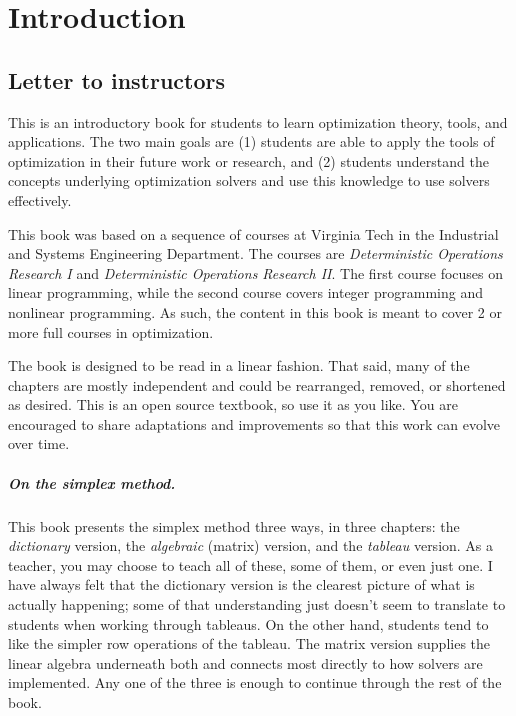 
\chapter*{Introduction}
\section*{Letter to instructors}

This is an introductory book for students to learn optimization theory, tools, and applications.  The two main goals are (1) students are able to apply the tools of optimization in their future work or research, and (2) students understand the concepts underlying optimization solvers and use this knowledge to use solvers effectively.

This book was based on a sequence of courses at Virginia Tech in the Industrial and Systems Engineering Department.   The courses are \emph{Deterministic Operations Research I} and \emph{Deterministic Operations Research II}.   The first course focuses on linear programming, while the second course covers integer programming and nonlinear programming.  As such, the content in this book is meant to cover 2 or more full courses in optimization.

The book is designed to be read in a linear fashion. That said, many of the chapters are mostly independent and could be rearranged, removed, or shortened as desired.  This is an open source textbook, so use it as you like.  You are encouraged to share adaptations and improvements so that this work can evolve over time.

\paragraph{On the simplex method.}
This book presents the simplex method three ways, in three chapters: the \emph{dictionary} version, the \emph{algebraic} (matrix) version, and the \emph{tableau} version.  As a teacher, you may choose to teach all of these, some of them, or even just one.  I have always felt that the dictionary version is the clearest picture of what is actually happening; some of that understanding just doesn't seem to translate to students when working through tableaus.  On the other hand, students tend to like the simpler row operations of the tableau.  The matrix version supplies the linear algebra underneath both and connects most directly to how solvers are implemented.  Any one of the three is enough to continue through the rest of the book.

